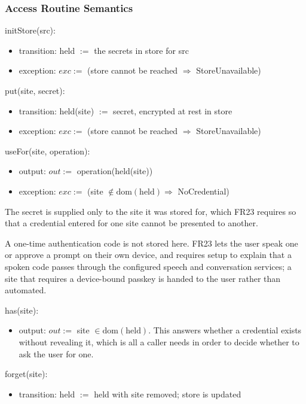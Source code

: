 \documentclass[12pt, titlepage]{article}
\begin{document}
\subsubsection{Access Routine Semantics}

\noindent initStore(src):
\begin{itemize}
\item transition: held $:=$ the secrets in store for src
\item exception: $exc :=$ (store cannot be reached $\Rightarrow$
StoreUnavailable)
\end{itemize}

\noindent put(site, secret):
\begin{itemize}
\item transition: held(site) $:=$ secret, encrypted at rest in store
\item exception: $exc :=$ (store cannot be reached $\Rightarrow$
StoreUnavailable)
\end{itemize}

\noindent useFor(site, operation):
\begin{itemize}
\item output: $out :=$ operation(held(site))
\item exception: $exc :=$ (site $\notin \mathrm{dom}(\text{held}) \Rightarrow$
NoCredential)
\end{itemize}

\noindent The secret is supplied only to the site it was stored for, which FR23
requires so that a credential entered for one site cannot be presented to
another.

\noindent A one-time authentication code is not stored here. FR23 lets the user
speak one or approve a prompt on their own device, and requires setup to explain
that a spoken code passes through the configured speech and conversation
services; a site that requires a device-bound passkey is handed to the user
rather than automated.

\noindent has(site):
\begin{itemize}
\item output: $out :=$ site $\in \mathrm{dom}(\text{held})$. This answers
whether a credential exists without revealing it, which is all a caller needs in
order to decide whether to ask the user for one.
\end{itemize}

\noindent forget(site):
\begin{itemize}
\item transition: held $:=$ held with site removed; store is updated
\end{itemize}
\end{document}
